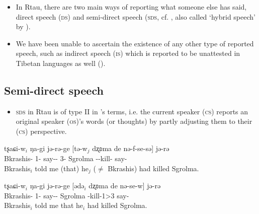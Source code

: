 \documentclass[oneside,a4paper,11pt]{article}
\newcommand{\ipa}[1]{{\phon #1}} %
\newcommand{\ipapl}[1]{{\phondroit #1}}
\begin{document}
\begin{itemize}

\item In Rtau, there are two main ways of reporting what someone else has said, direct speech (\textsc{ds}) and semi-direct speech (\textsc{sds}, cf. \citealp{aikhenvald08semidirect}, also called `hybrid speech' by \citealp{tournadre08conjunct}). 


\item We have been unable to ascertain the existence of any other type of reported speech, such as indirect speech (\textsc{is}) which is reported to be unattested in Tibetan languages as well (\citealp{tournadre08conjunct}).

\end{itemize}



\subsection{Semi-direct speech}

\begin{itemize}
 \item \textsc{sds} in Rtau is of type II in \cite{aikhenvald08semidirect}'s terms, i.e. the current speaker (\textsc{cs}) reports an original speaker (\textsc{os})'s words (or thoughts) by partly adjusting them to their (\textsc{cs}) perspective. 

\end{itemize}

\begin{exe}
\ex \label{ex:1b}
\gll
	\ipa{tʂaɕi-w}$_i$ \ipa{ŋa-gi}	\ipa{jə-rə-ge} [\ipapl{tə-w}$_j$	\ipapl{dʐʚma} 	\ipapl{de} \ipapl{nə-f-se-sə}] \ipa{jə-rə}  \\
	{Bkrashis-\erg} {1\sg-\dat} {say-\const-\conv} {3\sg-\erg} Sgrolma {\dem} {\prf-\inv-kill-\evid}  say-\const\\ 
	\glt Bkrashis$_i$ told me (that) he$_j$ ($\ne$ Bkrashis) had killed Sgrolma.
\end{exe}

\begin{exe}
\ex \label{ex:1c}
\gll
	\ipa{tʂaɕi-w}$_i$ \ipa{ŋa-gi}	\ipa{jə-rə-ge} [\ipapl{ədə}$_i$	\ipapl{dʐʚma} 	\ipapl{de} 	\ipapl{nə-se-w}] \ipa{jə-rə}  \\
	{Bkrashis-\erg} {1\sg-\dat} {say-\const-\conv} {} Sgrolma {\dem} {\prf-kill-1\sg>3} say-\const\\ 
	\glt Bkrashis$_i$ told me that he$_i$ had killed Sgrolma.
\end{exe}
\end{document}
